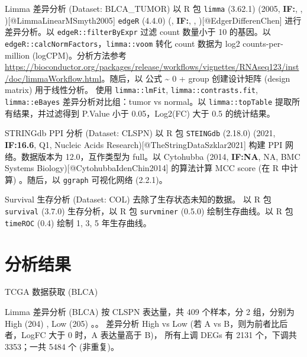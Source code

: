 \documentclass[
  ignorenonframetext,
]{beamer}
\begin{document}
\begin{frame}[fragile]{Limma 差异分析 (Dataset: BLCA\_TUMOR)}
\protect\hypertarget{limma-ux5deeux5f02ux5206ux6790-dataset-blca_tumor}{}
以 R 包 \texttt{limma} (3.62.1) (2005, \textbf{IF:}, ,
){[}@LimmaLinearMSmyth2005{]} \texttt{edgeR} (4.4.0) (, \textbf{IF:}, ,
){[}@EdgerDifferenChen{]} 进行差异分析。以 \texttt{edgeR::filterByExpr}
过滤 count 数量小于 10 的基因。以
\texttt{edgeR::calcNormFactors}，\texttt{limma::voom} 转化 count 数据为
log2 counts-per-million (logCPM)。分析方法参考
\url{https://bioconductor.org/packages/release/workflows/vignettes/RNAseq123/inst/doc/limmaWorkflow.html}。随后，以
公式 \textasciitilde{} 0 + group 创建设计矩阵 (design matrix)
用于线性分析。 使用 \texttt{limma::lmFit},
\texttt{limma::contrasts.fit}, \texttt{limma::eBayes}
差异分析对比组：tumor vs normal。以 \texttt{limma::topTable}
提取所有结果，并过滤得到 P.Value 小于 0.05，\textbar Log2(FC)\textbar{}
大于 0.5 的统计结果。
\end{frame}

\begin{frame}[fragile]{STRINGdb PPI 分析 (Dataset: CLSPN)}
\protect\hypertarget{stringdb-ppi-ux5206ux6790-dataset-clspn}{}
以 R 包 \texttt{STEINGdb} (2.18.0) (2021, \textbf{IF:16.6}, Q1, Nucleic
Acids Research){[}@TheStringDataSzklar2021{]} 构建 PPI 网络。数据版本为
12.0，互作类型为 full。以 Cytohubba (2014, \textbf{IF:NA}, NA, BMC
Systems Biology){[}@CytohubbaIdenChin2014{]} 的算法计算 MCC score (在 R
中计算) 。随后，以 \texttt{ggraph} 可视化网络 (2.2.1)。
\end{frame}

\begin{frame}[fragile]{Survival 生存分析 (Dataset: COL)}
\protect\hypertarget{survival-ux751fux5b58ux5206ux6790-dataset-col}{}
去除了生存状态未知的数据。 以 R 包 \texttt{survival} (3.7.0)
生存分析，以 R 包 \texttt{survminer} (0.5.0) 绘制生存曲线。以 R 包
\texttt{timeROC} (0.4) 绘制 1, 3, 5 年生存曲线。
\end{frame}

\hypertarget{workflow}{%
\section{分析结果}\label{workflow}}

\begin{frame}{TCGA 数据获取 (BLCA)}
\protect\hypertarget{tcga-ux6570ux636eux83b7ux53d6-blca}{}
\end{frame}

\begin{frame}{Limma 差异分析 (BLCA)}
\protect\hypertarget{limma-ux5deeux5f02ux5206ux6790-blca}{}
按 CLSPN 表达量，共 409 个样本，分 2 组，分别为 High (204) , Low (205)
。。 差异分析 High vs Low (若 A vs B，则为前者比后者，LogFC 大于 0 时，A
表达量高于 B)， 所有上调 DEGs 有 2131 个，下调共 3353；一共 5484 个
(非重复)。
\end{frame}
\end{document}
